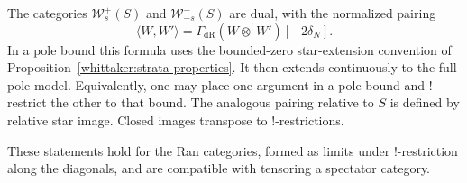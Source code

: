 \begin{proposition}\label{whittaker:duality}
The categories $\mathcal W_s^+(S)$ and $\mathcal W_{-s}^-(S)$ are dual,
with the normalized pairing
\begin{equation}\label{eq:W2}
 \langle W,W'\rangle=
 \Gamma_{\mathrm{dR}}(W\otimes^!W')[-2\delta_N].
\end{equation}
In a pole bound this formula uses the bounded-zero star-extension
convention of Proposition~\ref{whittaker:strata-properties}. It then
extends continuously to the full pole model. Equivalently, one may place
one argument in a pole bound and $!$-restrict the other to that bound.
The analogous pairing relative to $S$ is defined by relative star image.
Closed images transpose to $!$-restrictions.

These statements hold for the Ran categories, formed as limits under
$!$-restriction along the diagonals, and are compatible with tensoring a
spectator category.
\end{proposition}

